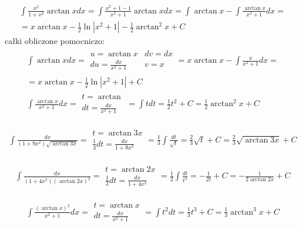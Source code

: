 
\begin{gather*}\int \frac{x^2}{1+x^2}\arctan x dx = \int \frac{x^2+1-1}{x^2+1}\arctan x dx = \int \arctan x - \int \frac{\arctan x}{x^2+1}dx =  \\
= x\arctan x - \frac{1}{2}\ln|x^2+1|- \frac{1}{2}\arctan^2 x+C\end{gather*}
całki obliczone pomocniczo:
\begin{gather*}\int \arctan x dx = \begin{array}{|ll|}
u=\arctan x & dv=dx \\
du=\frac{dx}{x^2+1} & v=x \end{array} = x\arctan x - \int \frac{x}{x^2+1}dx =  \\
= x\arctan x - \frac{1}{2}\ln|x^2+1|+C \\
\int \frac{\arctan x}{x^2+1}dx = \begin{array}{|l|} t=\arctan \\ dt=\frac{dx}{x^2+1} \end{array} = \int t dt = \frac{1}{2}t^2+C = \frac{1}{2}\arctan^2 x+C\end{gather*}



\begin{gather*}\int \frac{dx}{(1+9x^2)\sqrt{\arctan 3x}} = \begin{array}{|l|} t=\arctan 3x \\ \frac{1}{3}dt=\frac{dx}{1+9x^2} \end{array} = \frac{1}{3} \int \frac{dt}{\sqrt{t}} = \frac{2}{3}\sqrt{t}+C = \frac{2}{3}\sqrt{\arctan 3x}+C \end{gather*}



\begin{gather*}\int \frac{dx}{(1+4x^2)(\arctan 2x)^2} = \begin{array}{|l|} t=\arctan 2x \\ \frac{1}{2}dt=\frac{dx}{1+4x^2} \end{array} = \frac{1}{2} \int \frac{dt}{t^2} = -\frac{1}{2t}+C = -\frac{1}{2\arctan 2x}+C \end{gather*}



\begin{gather*}\int \frac{(\arctan x)^2}{x^2+1}dx = \begin{array}{|l|} t=\arctan x \\ dt=\frac{dx}{x^2+1} \end{array} = \int t^2 dt = \frac{1}{3}t^3+C = \frac{1}{3}\arctan^3 x+C\end{gather*}


